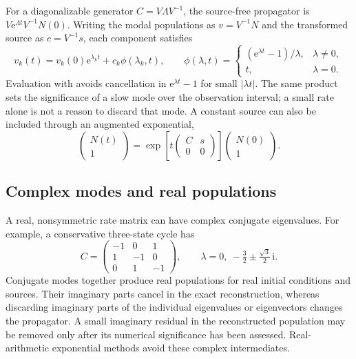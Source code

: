 \documentclass[11pt,a4paper]{article}
\newcommand{\code}[1]{\texttt{\detokenize{#1}}}
\newcommand{\ee}{\mathrm{e}}
\numberwithin{equation}{section}
\begin{document}
For a diagonalizable generator $C=V\Lambda V^{-1}$, the
source-free propagator is $V\ee^{\Lambda t}V^{-1}N(0)$.
Writing the modal populations as $v=V^{-1}N$ and the transformed
source as $c=V^{-1}s$, each component satisfies
\begin{equation}
 v_k(t)=v_k(0)\ee^{\lambda_kt}+c_k\phi(\lambda_k,t),\qquad
 \phi(\lambda,t)=\begin{cases}
  (\ee^{\lambda t}-1)/\lambda,&\lambda\ne0,\\t,&\lambda=0.
 \end{cases}\label{eq:source-mode}
\end{equation}
Evaluation with \code{expm1} avoids cancellation in
$\ee^{\lambda t}-1$ for small $|\lambda t|$. The same product
sets the significance of a slow mode over the observation interval;
a small rate alone is not a reason to discard that mode. A constant
source can also be included through an augmented exponential,
\begin{equation}\label{eq:augmented}
 \begin{pmatrix}N(t)\\1\end{pmatrix}
 =\exp\!\left[t\begin{pmatrix}C&s\\0&0\end{pmatrix}\right]
                 \begin{pmatrix}N(0)\\1\end{pmatrix}.
\end{equation}
\subsection{Complex modes and real populations}

A real, nonsymmetric rate matrix can have complex conjugate eigenvalues.
For example, a conservative three-state cycle has
\begin{equation}
 C=\begin{pmatrix}-1&0&1\\1&-1&0\\0&1&-1\end{pmatrix},\qquad
 \lambda=0,\ -\tfrac32\pm\tfrac{\sqrt3}{2}\,\mathrm i.
\end{equation}
Conjugate modes together produce real populations for real initial
conditions and sources. Their imaginary parts cancel in the exact
reconstruction, whereas discarding imaginary parts of the individual
eigenvalues or eigenvectors changes the propagator. A small imaginary
residual in the reconstructed population may be removed only after
its numerical significance has been assessed. Real-arithmetic
exponential methods avoid these complex intermediates.
\end{document}

